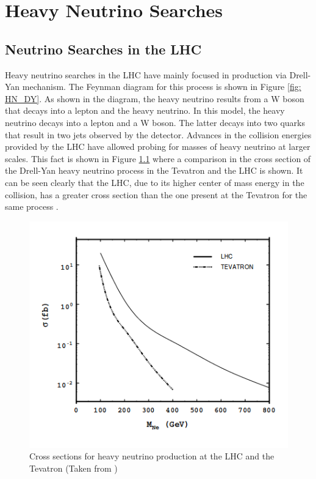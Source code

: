 \graphicspath{{NeutrinoSearches/Figures/}}

\chapter{Heavy Neutrino Searches}

\section{Neutrino Searches in the LHC}

Heavy neutrino searches in the LHC have mainly focused in production via Drell-Yan mechanism. The Feynman diagram for this process is shown in Figure \ref{fig: HN_DY}. As shown in the diagram, the heavy neutrino results from  a W boson that decays into a lepton and the heavy neutrino. In this model, the heavy neutrino decays into a lepton and a W boson. The latter decays into two quarks that result in two jets observed by the detector. Advances in the collision energies provided by the LHC have allowed probing for masses of heavy neutrino at larger scales. This fact is shown in Figure \ref{fig: LHCvsTevatron} where a comparison in the cross section of the Drell-Yan heavy neutrino process in the Tevatron and the LHC is shown. It can be seen clearly that the LHC, due to its higher center of mass energy in the collision, has a greater cross section than the one present at the Tevatron for the same process \cite{Tevatron}.


\begin{figure}[H]
\centering
\includegraphics[width=\linewidth]{LHCvsTevatron}
\caption{Cross sections for heavy neutrino production at the LHC and the Tevatron (Taken from \cite{Tevatron})}
\label{fig: LHCvsTevatron}
\end{figure}


